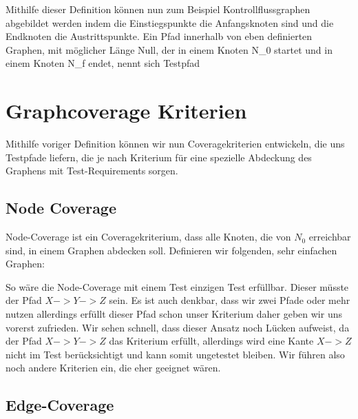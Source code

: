 Mithilfe dieser Definition können nun zum Beispiel Kontrollflussgraphen abgebildet werden indem die Einstiegspunkte die Anfangsknoten sind und die Endknoten die Austrittspunkte.
Ein Pfad innerhalb von eben definierten Graphen, mit möglicher Länge Null, der in einem Knoten N_{0} startet und in einem Knoten N_{f} endet, nennt sich Testpfad \cite[vgl. S. 28]{software-testing}

\section{Graphcoverage Kriterien}

Mithilfe voriger Definition können wir nun Coveragekriterien entwickeln, die uns Testpfade liefern, die je nach Kriterium für eine spezielle Abdeckung
des Graphens mit Test-Requirements sorgen.

\subsection{Node Coverage}

Node-Coverage ist ein Coveragekriterium, dass alle Knoten, die von $N_{0}$ erreichbar sind, in einem Graphen abdecken soll.
Definieren wir folgenden, sehr einfachen Graphen:


So wäre die Node-Coverage mit einem Test einzigen Test erfüllbar.
Dieser müsste der Pfad $X -> Y -> Z$ sein.
Es ist auch denkbar, dass wir zwei Pfade oder mehr nutzen allerdings erfüllt dieser Pfad schon unser Kriterium daher geben wir uns vorerst zufrieden.
Wir sehen schnell, dass dieser Ansatz noch Lücken aufweist, da der Pfad $X -> Y -> Z$ das Kriterium erfüllt, allerdings wird eine Kante $X -> Z$ nicht im
Test berücksichtigt und kann somit ungetestet bleiben.
Wir führen also noch andere Kriterien ein, die eher geeignet wären.

\subsection{Edge-Coverage}

